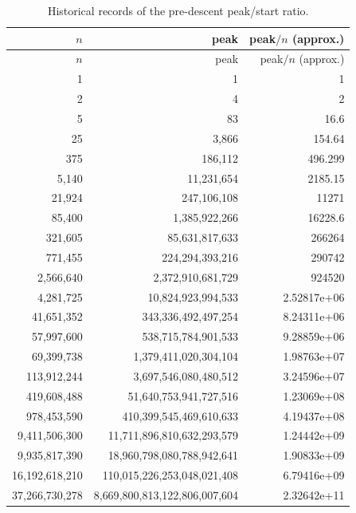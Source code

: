 \documentclass[11pt]{article}
\theoremstyle{definition}
\begin{document}
\begin{longtable}{r r r}
\caption{Historical records of the pre-descent peak/start ratio.}\\
\toprule
$n$ & peak & peak$/n$ (approx.)\\
\midrule
\endfirsthead
\toprule
$n$ & peak & peak$/n$ (approx.)\\
\midrule
\endhead
1 & 1 & 1 \\
2 & 4 & 2 \\
5 & 83 & 16.6 \\
25 & 3{,}866 & 154.64 \\
375 & 186{,}112 & 496.299 \\
5{,}140 & 11{,}231{,}654 & 2185.15 \\
21{,}924 & 247{,}106{,}108 & 11271 \\
85{,}400 & 1{,}385{,}922{,}266 & 16228.6 \\
321{,}605 & 85{,}631{,}817{,}633 & 266264 \\
771{,}455 & 224{,}294{,}393{,}216 & 290742 \\
2{,}566{,}640 & 2{,}372{,}910{,}681{,}729 & 924520 \\
4{,}281{,}725 & 10{,}824{,}923{,}994{,}533 & 2.52817e+06 \\
41{,}651{,}352 & 343{,}336{,}492{,}497{,}254 & 8.24311e+06 \\
57{,}997{,}600 & 538{,}715{,}784{,}901{,}533 & 9.28859e+06 \\
69{,}399{,}738 & 1{,}379{,}411{,}020{,}304{,}104 & 1.98763e+07 \\
113{,}912{,}244 & 3{,}697{,}546{,}080{,}480{,}512 & 3.24596e+07 \\
419{,}608{,}488 & 51{,}640{,}753{,}941{,}727{,}516 & 1.23069e+08 \\
978{,}453{,}590 & 410{,}399{,}545{,}469{,}610{,}633 & 4.19437e+08 \\
9{,}411{,}506{,}300 & 11{,}711{,}896{,}810{,}632{,}293{,}579 & 1.24442e+09 \\
9{,}935{,}817{,}390 & 18{,}960{,}798{,}080{,}788{,}942{,}641 & 1.90833e+09 \\
16{,}192{,}618{,}210 & 110{,}015{,}226{,}253{,}048{,}021{,}408 & 6.79416e+09 \\
37{,}266{,}730{,}278 & 8{,}669{,}800{,}813{,}122{,}806{,}007{,}604 & 2.32642e+11 \\
\bottomrule
\end{longtable}
\end{document}
